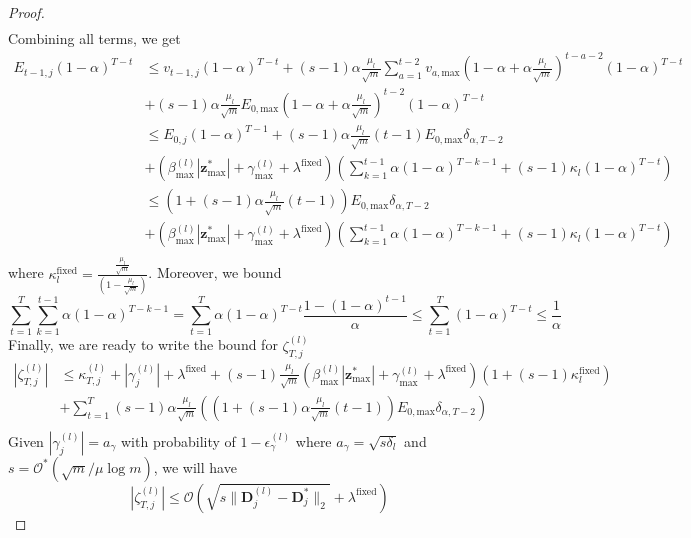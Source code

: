\documentclass[10pt]{article} %
\newcommand{\D}{{\bm D}}
\newcommand{\z}{{\bm z}}
\begin{document}
\begin{proof}
\begin{equation}
\begin{aligned}
\end{aligned}
\end{equation}
Combining all terms, we get
\begin{equation}\label{eq:Ealpha_2}
\begin{aligned}
E_{t-1, j} (1 - \alpha)^{T-t} &\leq v_{t-1, j} (1 - \alpha)^{T-t} + (s-1) \alpha \frac{\mu_l}{\sqrt{m}} \sum_{a=1}^{t-2} v_{a, \text{max}} (1 - \alpha + \alpha \frac{\mu_l}{\sqrt{m}})^{t - a - 2} (1 - \alpha)^{T-t}\\
&+ (s-1) \alpha \frac{\mu_l}{\sqrt{m}} E_{0, \text{max}} (1 - \alpha + \alpha \frac{\mu_l}{\sqrt{m}})^{t-2} (1 - \alpha)^{T-t}\\
&\leq E_{0, j} (1 - \alpha)^{T-1} + (s-1) \alpha \frac{\mu_l}{\sqrt{m}} (t-1) E_{0, \text{max}} \delta_{\alpha, T-2}\\
&+ (\beta_{\text{max}}^{(l)} | \z^{\ast}_{\text{max}} | + \gamma_{\text{max}}^{(l)} + \lambda^{\text{fixed}}) \left( \sum_{k=1}^{t-1} \alpha (1 - \alpha)^{T-k-1} + (s-1) \kappa_l (1 - \alpha)^{T-t} \right)\\
&\leq (1 + (s-1) \alpha \frac{\mu_l}{\sqrt{m}} (t-1)) E_{0, \text{max}} \delta_{\alpha, T-2}\\
&+ (\beta_{\text{max}}^{(l)} | \z^{\ast}_{\text{max}} | + \gamma_{\text{max}}^{(l)} + \lambda^{\text{fixed}}) \left( \sum_{k=1}^{t-1} \alpha (1 - \alpha)^{T-k-1} + (s-1) \kappa_l (1 - \alpha)^{T-t} \right)\\
\end{aligned}
\end{equation}
where $\kappa_l^{\text{fixed}} = \frac{\frac{\mu_l}{\sqrt{m}}}{ (1 - \frac{\mu_l}{\sqrt{m}})}$. Moreover, we bound
\begin{equation}
\sum_{t=1}^T \sum_{k=1}^{t-1} \alpha (1 - \alpha)^{T-k-1} = \sum_{t=1}^T \alpha (1 - \alpha)^{T-t} \frac{1 - (1-\alpha)^{t-1}}{\alpha}
\leq \sum_{t=1}^T (1 - \alpha)^{T-t} \leq \frac{1}{\alpha}
\end{equation}
Finally, we are ready to write the bound for $\zeta_{T,j}^{(l)}$
\begin{equation}
\begin{aligned}
| \zeta _{T,j}^{(l)} | &\leq \kappa_{T,j}^{(l)} + | \gamma_j^{(l)} | + \lambda^{\text{fixed}} + (s-1) \frac{\mu_l}{\sqrt{m}} (\beta_{\text{max}}^{(l)} | \z^{\ast}_{\text{max}} | + \gamma_{\text{max}}^{(l)} + \lambda^{\text{fixed}}) ( 1 + (s-1) \kappa_l^{\text{fixed}})\\
&+ \sum_{t=1}^T (s-1) \alpha \frac{\mu_l}{\sqrt{m}} ((1 + (s-1) \alpha \frac{\mu_l}{\sqrt{m}} (t-1)) E_{0, \text{max}} \delta_{\alpha, T-2})\\
\end{aligned}
\end{equation}
Given $| \gamma_j^{(l)} | = a_{\gamma}$ with probability of $1 - \epsilon_{\gamma}^{(l)}$ where $a_{\gamma} = \sqrt{s \delta_l}$ and $s = \mathcal{O}^{\ast}(\sqrt{m} / \mu \log{m})$, we will have
\begin{equation}
    | \zeta_{T,j}^{(l)} | \leq \mathcal{O}(\sqrt{s \| \D_j^{(l)} - \D_j^{\ast} \|_2} + \lambda^{\text{fixed}})
\end{equation}
\end{proof}
\end{document}
